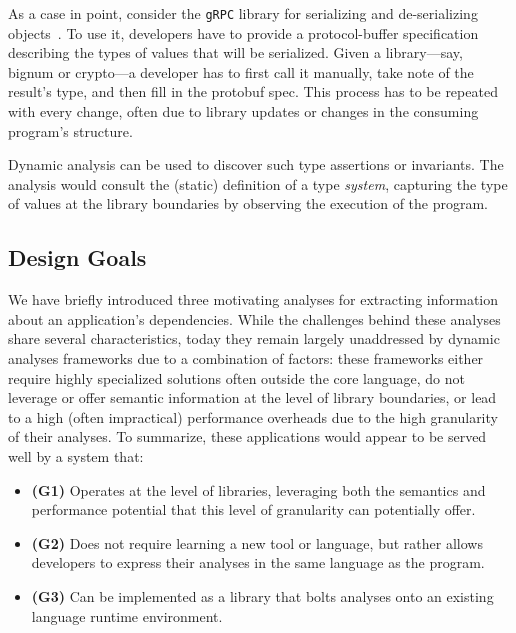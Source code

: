 \documentclass[letterpaper,twocolumn,10pt]{article}
\newcommand{\heading}[1]{\vspace{2pt}\noindent\textbf{#1}\enspace}
\newcommand{\ttt}[1]{\texttt{#1}}
\begin{document}
As a case in point, consider the \ttt{gRPC} library for serializing and de-serializing objects~\cite{grpc}.
To use it, developers have to provide a protocol-buffer specification describing the types of values that will be serialized.
Given a library---say, bignum or crypto---a developer has to first call it manually, take note of the result's type, and then fill in the protobuf spec. %
This process has to be repeated with every change, often due to library updates or changes in the consuming program's structure.

Dynamic analysis can be used to discover such type assertions or invariants.
The analysis would consult the (static) definition of a type \emph{system}, capturing the type of values at the library boundaries by observing the execution of the program.




\subsection{Design Goals}
\label{goals}

We have briefly introduced three motivating analyses for extracting information about an application's dependencies.
While the challenges behind these analyses share several characteristics, today they remain largely unaddressed by dynamic analyses frameworks due to a combination of factors:
  these frameworks either require highly specialized solutions often outside the core language,
  do not leverage or offer semantic information at the level of library boundaries, or
  lead to a high (often impractical) performance overheads due to the high granularity of their analyses.
To summarize, these applications would appear to be served well by a system that:
\begin{itemize}
  \item \textbf{(G1)} Operates at the level of libraries, leveraging both the semantics and performance potential that this level of granularity can potentially offer.
  \item \textbf{(G2)} Does not require learning a new tool or language, but rather allows developers to express their analyses in the same language as the program.
  \item \textbf{(G3)} Can be implemented as a library that bolts analyses onto an existing language runtime environment.
\end{itemize}
\end{document}
